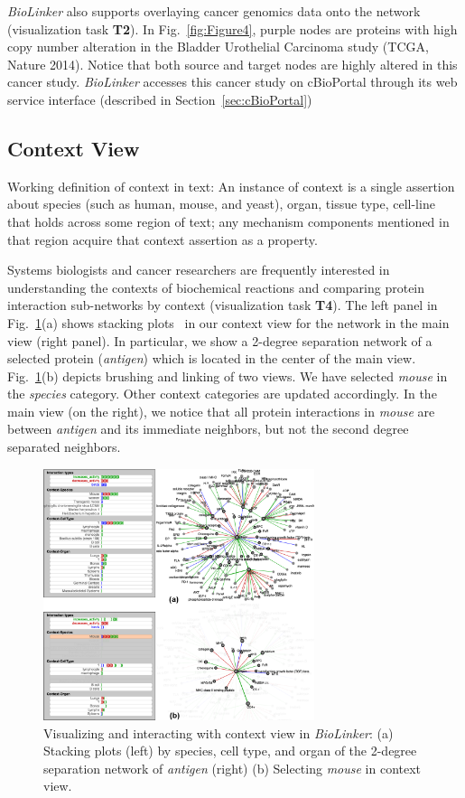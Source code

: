 \documentclass[journal]{vgtc}                %
\newcommand{\theName}{\textit{BioLinker}}
\begin{document}
\theName{} also supports overlaying cancer genomics data onto the network (visualization task \textbf{T2}). In Fig.~\ref{fig:Figure4}, purple nodes are proteins with high copy number alteration in the Bladder Urothelial Carcinoma study (TCGA, Nature 2014). Notice that both source and target nodes are highly altered in this cancer study. \theName{} accesses this cancer study on cBioPortal through its web service interface (described in Section~\ref{sec:cBioPortal})

\subsection{Context View}
\label{sec:ContextView}
Working definition of context in text: An instance of context is a single assertion about species (such as human, mouse, and yeast), organ, tissue type, cell-line that holds across some region of text; any mechanism components mentioned in that region acquire that context assertion as a property. 

Systems biologists and cancer researchers are frequently interested in understanding the contexts of biochemical reactions and comparing protein interaction sub-networks by context (visualization task \textbf{T4}). The left panel in Fig.~\ref{fig:Figure5}(a) shows stacking plots~\cite{Dang2010Stacking} in our context view for the network in the main view (right panel). In particular, we show a 2-degree separation network of a selected protein (\textit{antigen}) which is located in the center of the main view. Fig.~\ref{fig:Figure5}(b) depicts brushing and linking of two views. We have selected \textit{mouse} in the \textit{species} category. Other context categories are updated accordingly. In the main view (on the right), we notice that all protein interactions in \textit{mouse} are between \textit{antigen} and its immediate neighbors, but not the second degree separated neighbors.  

\begin{figure}[h!]
  \centering
  \includegraphics[width=225pt]{figures/Figure5.png}
  \caption{ Visualizing and interacting with context view in \theName{}: (a) Stacking plots (left) by species, cell type, and organ of the 2-degree separation network of \textit{antigen} (right) (b) Selecting \textit{mouse} in context view.}
  \label{fig:Figure5}
\end{figure}
\end{document}
